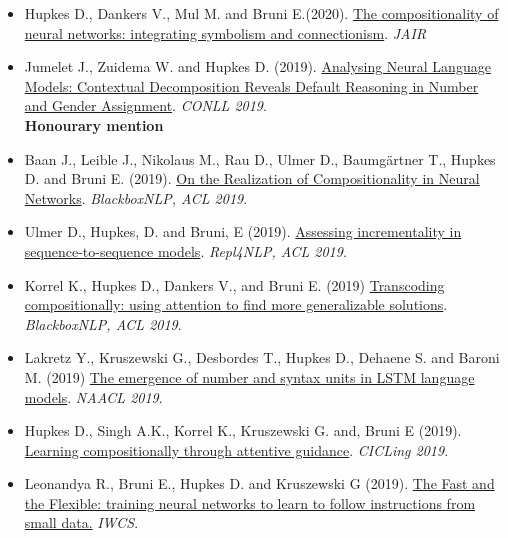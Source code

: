 \begin{itemize}
\setlength\itemsep{5pt}
    \item Hupkes D., Dankers V., Mul M. and Bruni E.(2020). \href{https://www.jair.org/index.php/jair/article/view/11674/26576}{The compositionality of neural networks: integrating symbolism and connectionism}. \textit{JAIR}
    
    \item Jumelet J., Zuidema W. and Hupkes D. (2019). \href{https://arxiv.org/pdf/1909.08975.pdf}{Analysing Neural Language Models: Contextual Decomposition Reveals Default Reasoning in Number and Gender Assignment}. \textit{CONLL 2019}.\\ \textbf{Honourary mention}
    
    \item Baan J., Leible J., Nikolaus M., Rau D., Ulmer D., Baumgärtner T., Hupkes D. and Bruni E. (2019). \href{https://www.aclweb.org/anthology/W19-4814}{On the Realization of Compositionality in Neural Networks}. \textit{BlackboxNLP, ACL 2019}. 
    
    \item Ulmer D., Hupkes, D. and Bruni, E (2019). \href{https://www.aclweb.org/anthology/W19-4324}{Assessing incrementality in sequence-to-sequence models}. \textit{Repl4NLP, ACL 2019}. 
    
    \item Korrel K., Hupkes D., Dankers V., and Bruni E. (2019) \href{https://www.aclweb.org/anthology/W19-4801}{Transcoding compositionally: using attention to find more generalizable solutions}. \textit{BlackboxNLP, ACL 2019}.
    
    \item Lakretz Y., Kruszewski G., Desbordes T., Hupkes D., Dehaene S. and Baroni M. (2019) \href{https://www.aclweb.org/anthology/N19-1002}{The emergence of number and syntax units in LSTM language models}. \textit{NAACL 2019}.

    \item  Hupkes D., Singh A.K., Korrel K., Kruszewski G. and, Bruni E (2019). \href{https://arxiv.org/abs/1805.09657}{Learning compositionally through attentive guidance}. \textit{CICLing 2019}.
    
    \item Leonandya R., Bruni E., Hupkes D. and Kruszewski G (2019). \href{https://www.aclweb.org/anthology/W19-0419/}{The Fast and the Flexible: training neural networks to learn to follow instructions from small data.} \textit{IWCS}. 
    

\end{itemize}
